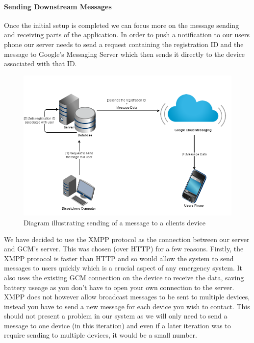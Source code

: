 \documentclass{article}
\begin{document}
	
		\paragraph{Sending Downstream Messages}
		Once the initial setup is completed we can focus more on the message sending and receiving parts of the application. In order to push a notification to our users phone our server needs to send a request containing the registration ID and the message to Google’s Messaging Server which then sends it directly to the device associated with that ID.\\

	\begin{figure}[H]
		\centering
		\includegraphics[width=1\textwidth]{"Sending a message via GCM - Iteration 0"}
		\caption{Diagram illustrating sending of a message to a clients device}
	\end{figure}
	
	We have decided to use the XMPP protocol as the connection between our server and GCM’s server. This was chosen (over HTTP) for a few reasons. Firstly, the XMPP protocol is faster than HTTP and so would allow the system to send messages to users quickly which is a crucial aspect of any emergency system. It also uses the existing GCM connection on the device to receive the data, saving battery useage as you don't have to open your own connection to the server. XMPP does not however allow broadcast messages to be sent to multiple devices, instead you have to send a new message for each device you wish to contact. This should not present a problem in our system as we will only need to send a message to one device (in this iteration) and even if a later iteration was to require sending to multiple devices, it would be a small number.\\
	
\end{document}

